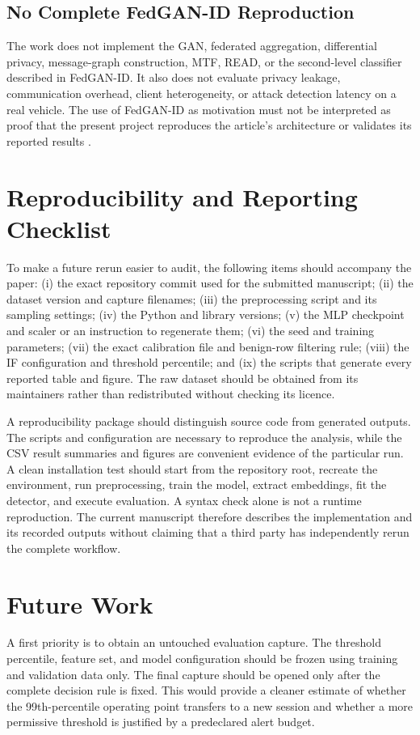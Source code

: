 \documentclass[journal]{IEEEtran}
\begin{document}
\subsection{No Complete FedGAN-ID Reproduction}
The work does not implement the GAN, federated aggregation, differential privacy, message-graph construction, MTF, READ, or the second-level classifier described in FedGAN-ID. It also does not evaluate privacy leakage, communication overhead, client heterogeneity, or attack detection latency on a real vehicle. The use of FedGAN-ID as motivation must not be interpreted as proof that the present project reproduces the article's architecture or validates its reported results \cite{chen2025fedgan}.



\section{Reproducibility and Reporting Checklist}
To make a future rerun easier to audit, the following items should accompany the paper: (i) the exact repository commit used for the submitted manuscript; (ii) the dataset version and capture filenames; (iii) the preprocessing script and its sampling settings; (iv) the Python and library versions; (v) the MLP checkpoint and scaler or an instruction to regenerate them; (vi) the seed and training parameters; (vii) the exact calibration file and benign-row filtering rule; (viii) the IF configuration and threshold percentile; and (ix) the scripts that generate every reported table and figure. The raw dataset should be obtained from its maintainers rather than redistributed without checking its licence.

A reproducibility package should distinguish source code from generated outputs. The scripts and configuration are necessary to reproduce the analysis, while the CSV result summaries and figures are convenient evidence of the particular run. A clean installation test should start from the repository root, recreate the environment, run preprocessing, train the model, extract embeddings, fit the detector, and execute evaluation. A syntax check alone is not a runtime reproduction. The current manuscript therefore describes the implementation and its recorded outputs without claiming that a third party has independently rerun the complete workflow.

\section{Future Work}
A first priority is to obtain an untouched evaluation capture. The threshold percentile, feature set, and model configuration should be frozen using training and validation data only. The final capture should be opened only after the complete decision rule is fixed. This would provide a cleaner estimate of whether the 99th-percentile operating point transfers to a new session and whether a more permissive threshold is justified by a predeclared alert budget.
\end{document}
